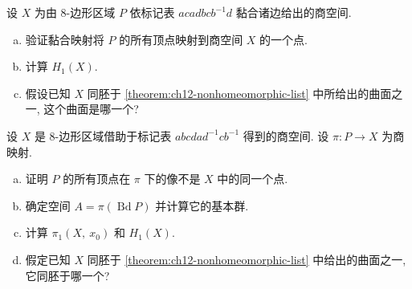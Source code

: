 \begin{exercise}
\label{exercise:ch12-sec75-03}
设 $X$ 为由 $8$-边形区域 $P$ 依标记表 $acadbcb^{-1}d$ 黏合诸边给出的商空间.
\begin{enumerate}[(a)]
\item 验证黏合映射将 $P$ 的所有顶点映射到商空间 $X$ 的一个点.
\item 计算 $H_{1}(X)$.
\item 假设已知 $X$ 同胚于 \cref{theorem:ch12-nonhomeomorphic-list} 中所给出的曲面之一, 这个曲面是哪一个?
\end{enumerate}
\end{exercise}

\begin{exercise}
\label{exercise:ch12-sec75-04}
设 $X$ 是 $8$-边形区域借助于标记表 $abcdad^{-1}cb^{-1}$ 得到的商空间. 设 $\pi\colon P\to X$ 为商映射.
\begin{enumerate}[(a)]
\item 证明 $P$ 的所有顶点在 $\pi$ 下的像不是 $X$ 中的同一个点.
\item 确定空间 $A=\pi(\operatorname{Bd}P)$ 并计算它的基本群.
\item 计算 $\pi_{1}(X,\ x_{0})$ 和 $H_{1}(X)$.
\item 假定已知 $X$ 同胚于 \cref{theorem:ch12-nonhomeomorphic-list} 中给出的曲面之一, 它同胚于哪一个?
\end{enumerate}
\end{exercise}
